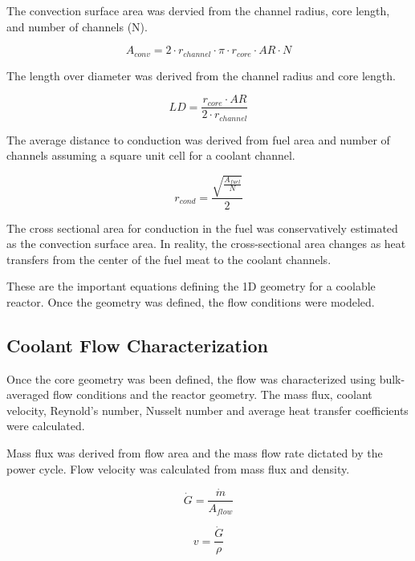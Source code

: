 The convection surface area was dervied from the channel radius, core length, and
number of channels (N).

\begin{equation}
    A_{conv} = 2\cdot r_{channel}\cdot \pi\cdot r_{core}\cdot AR\cdot N
\end{equation}

The length over diameter was derived from the channel radius and core length.

\begin{equation}
    LD = \frac{r_{core}\cdot AR}{2\cdot r_{channel}}
\end{equation}

The average distance to conduction was derived from fuel area and number of
channels assuming a square unit cell for a coolant channel.

\begin{equation}
    r_{cond} = \frac{\sqrt{\frac{A_{fuel}}{N}}}{2}
    \label{r_cond}
\end{equation}

The cross sectional area for conduction in the fuel was conservatively estimated
as the convection surface area. In reality, the cross-sectional area changes as
heat transfers from the center of the fuel meat to the coolant channels.

These are the important equations defining the 1D geometry for a coolable
reactor. Once the geometry was defined, the flow conditions were modeled.

\subsection{Coolant Flow Characterization}

Once the core geometry was been defined, the flow was characterized using
bulk-averaged flow conditions and the reactor geometry. The mass flux, coolant
velocity, Reynold's number, Nusselt number and average heat transfer
coefficients were calculated.

Mass flux was derived from flow area and the mass flow rate dictated by the power
cycle. Flow velocity was calculated from mass flux and density.

\begin{equation}
    \dot{G} = \frac{\dot{m}}{A_{flow}}
\end{equation}

\begin{equation}
    v = \frac{\dot{G}}{\rho}
\end{equation}

